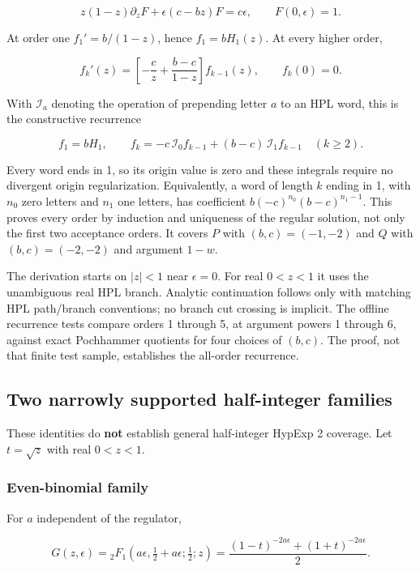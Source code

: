 \documentclass[
  11pt,
]{article}
\begin{document}
\[z(1-z)\partial_zF+\epsilon(c-bz)F=c\epsilon,\qquad F(0,\epsilon)=1.\]

At order one \(f_1'=b/(1-z)\), hence \(f_1=bH_1(z)\). At every higher
order,

\[f_k'(z)=\left[-\frac{c}{z}+\frac{b-c}{1-z}\right]f_{k-1}(z),
\qquad f_k(0)=0.\]

With \(\mathcal I_a\) denoting the operation of prepending letter \(a\)
to an HPL word, this is the constructive recurrence

\[\boxed{f_1=bH_1,\qquad
f_k=-c\,\mathcal I_0 f_{k-1}+(b-c)\,\mathcal I_1 f_{k-1}\quad(k\geq2).}\]

Every word ends in 1, so its origin value is zero and these integrals
require no divergent origin regularization. Equivalently, a word of
length \(k\) ending in 1, with \(n_0\) zero letters and \(n_1\) one
letters, has coefficient \(b(-c)^{n_0}(b-c)^{n_1-1}\). This proves every
order by induction and uniqueness of the regular solution, not only the
first two acceptance orders. It covers \(P\) with \((b,c)=(-1,-2)\) and
\(Q\) with \((b,c)=(-2,-2)\) and argument \(1-w\).

The derivation starts on \(|z|<1\) near \(\epsilon=0\). For real
\(0<z<1\) it uses the unambiguous real HPL branch. Analytic continuation
follows only with matching HPL path/branch conventions; no branch cut
crossing is implicit. The offline recurrence tests compare orders 1
through 5, at argument powers 1 through 6, against exact Pochhammer
quotients for four choices of \((b,c)\). The proof, not that finite test
sample, establishes the all-order recurrence.

\subsection{Two narrowly supported half-integer
families}\label{two-narrowly-supported-half-integer-families}

These identities do \textbf{not} establish general half-integer HypExp 2
coverage. Let \(t=\sqrt z\) with real \(0<z<1\).

\subsubsection{Even-binomial family}\label{even-binomial-family}

For \(a\) independent of the regulator,

\[G(z,\epsilon)={}_2F_1(a\epsilon,\tfrac12+a\epsilon;\tfrac12;z)
=\frac{(1-t)^{-2a\epsilon}+(1+t)^{-2a\epsilon}}2.\]
\end{document}
